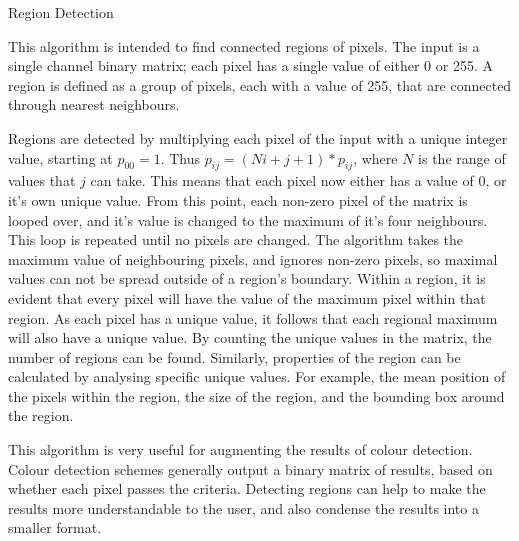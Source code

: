 
Region Detection

This algorithm is intended to find connected regions of pixels.
The input is a single channel binary matrix; each pixel has a single value of either 0 or 255.
A region is defined as a group of pixels, each with a value of 255, that are connected through nearest neighbours.

Regions are detected by multiplying each pixel of the input with a unique integer value, starting at $p_{00}=1$.
Thus $p_{ij} = (Ni+j+1)*p_{ij}$, where $N$ is the range of values that $j$ can take.
This means that each pixel now either has a value of 0, or it's own unique value.
From this point, each non-zero pixel of the matrix is looped over, and it's value is changed to the maximum of it's four neighbours.
This loop is repeated until no pixels are changed.
The algorithm takes the maximum value of neighbouring pixels, and ignores non-zero pixels, so maximal values can not be spread outside of a region's boundary.
Within a region, it is evident that every pixel will have the value of the maximum pixel within that region.
As each pixel has a unique value, it follows that each regional maximum will also have a unique value.
By counting the unique values in the matrix, the number of regions can be found.
Similarly, properties of the region can be calculated by analysing specific unique values.
For example, the mean position of the pixels within the region, the size of the region, and the bounding box around the region.

This algorithm is very useful for augmenting the results of colour detection.
Colour detection schemes generally output a binary matrix of results, based on whether each pixel passes the criteria.
Detecting regions can help to make the results more understandable to the user, and also condense the results into a smaller format.
